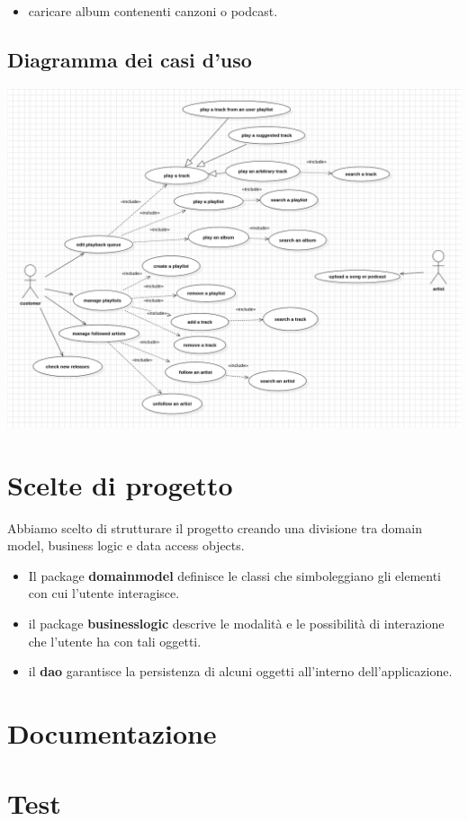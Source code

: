 \documentclass{article}
\begin{document}
\begin{itemize}
\item
  caricare album contenenti canzoni o podcast.
\end{itemize}

\subsection{Diagramma dei casi d'uso}
\includegraphics[scale=0.3]{usecase02}

\section{Scelte di progetto}

Abbiamo scelto di strutturare il progetto creando una divisione tra domain model, business logic e data
access objects.
\begin{itemize}
  \item
    Il package  \textbf{domainmodel} definisce le classi che simboleggiano gli elementi con cui l'utente
    interagisce.
  \item
    il package \textbf{businesslogic} descrive le modalità e le possibilità di interazione che l'utente
    ha con tali oggetti.
  \item
    il \textbf{dao} garantisce la persistenza di alcuni oggetti all'interno dell'applicazione.

   \end{itemize}
    
\section{Documentazione}

\section{Test}   
\end{document}
